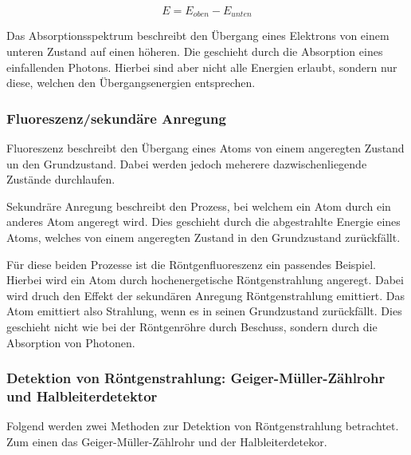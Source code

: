 \documentclass{article}
\begin{document}
    \[
        E=E_{oben}-E_{unten}
    \]

Das Absorptionsspektrum beschreibt den Übergang eines Elektrons von einem unteren Zustand auf einen höheren. Die geschieht durch die Absorption eines einfallenden Photons. Hierbei sind aber nicht alle Energien erlaubt, sondern nur diese, welchen den Übergangsenergien entsprechen.

\subsubsection{Fluoreszenz/sekundäre Anregung}

\cite{spektrum_2}

Fluoreszenz beschreibt den Übergang eines Atoms von einem angeregten Zustand un den Grundzustand. Dabei werden jedoch meherere dazwischenliegende Zustände durchlaufen.

Sekundräre Anregung beschreibt den Prozess, bei welchem ein Atom durch ein anderes Atom angeregt wird. Dies geschieht durch die abgestrahlte Energie eines Atoms, welches von einem angeregten Zustand in den Grundzustand zurückfällt.

Für diese beiden Prozesse ist die Röntgenfluoreszenz ein passendes Beispiel. Hierbei wird ein Atom durch hochenergetische Röntgenstrahlung angeregt. Dabei wird druch den Effekt der sekundären Anregung Röntgenstrahlung emittiert. Das Atom emittiert also Strahlung, wenn es in seinen Grundzustand zurückfällt. Dies geschieht nicht wie bei der Röntgenröhre durch Beschuss, sondern durch die Absorption von Photonen.

\subsubsection{Detektion von Röntgenstrahlung: Geiger-Müller-Zählrohr und Halbleiterdetektor}

Folgend werden zwei Methoden zur Detektion von Röntgenstrahlung betrachtet. Zum einen das Geiger-Müller-Zählrohr und der Halbleiterdetekor.
\end{document}
